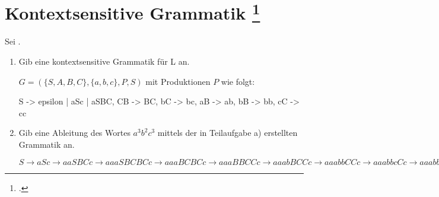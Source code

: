 \documentclass{lehramt-informatik-aufgabe}
\begin{document}
\section{Kontextsensitive Grammatik
\footcite{theo:ab:3}}

Sei .

\begin{enumerate}


\item Gib eine kontextsensitive Grammatik für L an.

\begin{liAntwort}
$G = (\{S, A, B, C\}, \{a, b, c\}, P, S)$ mit Produktionen $P$ wie
folgt:

\begin{liProduktionsRegeln}
S -> epsilon | aSc | aSBC,
CB -> BC,
bC -> bc,
aB -> ab,
bB -> bb,
cC -> cc
\end{liProduktionsRegeln}
\end{liAntwort}


\item Gib eine Ableitung des Wortes $a^3 b^2 c^3$ mittels der in
Teilaufgabe a) erstellten Grammatik an.

\begin{liAntwort}
$S
\rightarrow aSc
\rightarrow aaSBCc
\rightarrow aaaSBCBCc
\rightarrow aaaBCBCc
\rightarrow aaaBBCCc
\rightarrow aaabBCCc
\rightarrow aaabbCCc
\rightarrow aaabbcCc
\rightarrow aaabbccc
$
\end{liAntwort}
\end{enumerate}
\end{document}
